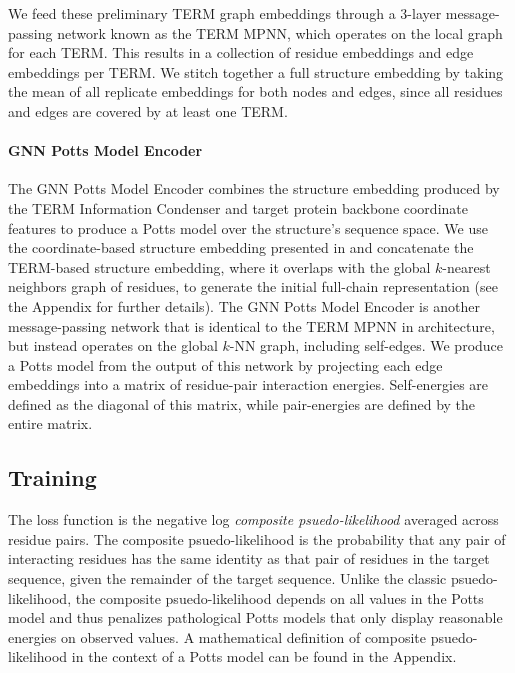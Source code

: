 \documentclass{article}
\begin{document}
            We feed these preliminary TERM graph embeddings through a 3-layer message-passing network known as the TERM MPNN, which operates on the local graph for each TERM. This results in a collection of residue embeddings and edge embeddings per TERM. We stitch together a full structure embedding by taking the mean of all replicate embeddings for both nodes and edges, since all residues and edges are covered by at least one TERM. 
            
        \paragraph{GNN Potts Model Encoder}
            The GNN Potts Model Encoder combines the structure embedding produced by the TERM Information Condenser and target protein backbone coordinate features to produce a Potts model over the structure's sequence space. We use the coordinate-based structure embedding presented in \citet{Ingraham2019} and concatenate the TERM-based structure embedding, where it overlaps with the global $k$-nearest neighbors graph of residues, to generate the initial full-chain representation (see the Appendix for further details). The GNN Potts Model Encoder is another message-passing network that is identical to the TERM MPNN in architecture, but instead operates on the global $k$-NN graph, including self-edges. We produce a Potts model from the output of this network by projecting each edge embeddings into a matrix of residue-pair interaction energies. Self-energies are defined as the diagonal of this matrix, while pair-energies are defined by the entire matrix.
            
    \subsection{Training}
        The loss function is the negative log \textit{composite psuedo-likelihood} averaged across residue pairs. The composite psuedo-likelihood is the probability that any pair of interacting residues has the same identity as that pair of residues in the target sequence, given the remainder of the target sequence. Unlike the classic psuedo-likelihood, the composite psuedo-likelihood depends on all values in the Potts model and thus penalizes pathological Potts models that only display reasonable energies on observed values. A mathematical definition of composite psuedo-likelihood in the context of a Potts model can be found in the Appendix. 
        
\end{document}

